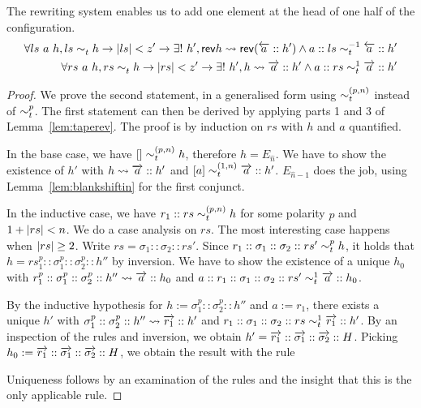 \documentclass[a4paper,UKenglish,cleveref, autoref]{lipics-v2019}
\newcommand{\strent}{\rightsquigarrow}
\begin{document}
\begin{lemma}\label{lem:tapeadd}
  The rewriting system enables us to add one element at the head of one half of the configuration.
  \begin{align*}
    \forall ls~a~h, ls \reprt{} h \rightarrow \length{ls} < z' \rightarrow \exists!~h', \rev{h} \strent{} \rev{(\polneg{a} :: h')} \land a :: ls \reprt{-1} \polneg{a} :: h' \\
    \forall rs~a~h, rs \reprt{} h \rightarrow \length{rs} < z' \rightarrow \exists!~h', h \strent{} \polpos{a} :: h' \land a :: rs \reprt{1} \polpos{a} :: h'
  \end{align*}
\end{lemma}
\begin{proof}
  We prove the second statement, in a generalised form using $\sim_t^{(p, n)}$ instead of $\sim_t^{p}$. 
  The first statement can then be derived by applying parts 1 and 3 of Lemma~\ref{lem:taperev}. 
  The proof is by induction on $rs$ with $h$ and $a$ quantified. 

  In the base case, we have $[] \sim_t^{(p, n)} h$, therefore $h = E_{\hat{n}}$. We have to show the existence of $h'$ with $h \strent{} \polpos{a} :: h'$ and $[a] \sim_t^{(1, n)} \overrightarrow{a} :: h'$. $E_{\hat{n}-1}$ does the job, using Lemma~\ref{lem:blankshiftin} for the first conjunct. 

  In the inductive case, we have $r_1 :: rs \sim_t^{(p, n)} h$ for some polarity $p$ and $1 +{|rs|} < n$. We do a case analysis on $rs$. The most interesting case happens when $|rs| \ge 2$. Write $rs = \sigma_1 :: \sigma_2 :: rs'$. 
  Since $r_1 :: \sigma_1 :: \sigma_2 ::rs' \sim_t^{p} h$, it holds that $h = rs_1^p :: \sigma_1^p :: \sigma_2^p :: h''$ by inversion. 
  We have to show the existence of a unique $h_0$ with $r_1^p :: \sigma_1^p :: \sigma_2^p :: h'' \strent{} \polpos{a} :: h_0$ and $a::r_1 :: \sigma_1 :: \sigma_2 :: rs' \sim_t^{1} \overrightarrow{a} :: h_0$. 

  By the inductive hypothesis for $h := \sigma_1^p :: \sigma_2^p :: h''$ and $a := r_1$, there exists a unique $h'$ with $\sigma_1^p :: \sigma_2^p :: h'' \strent{} \polpos{r_1} :: h'$ and $r_1 :: \sigma_1 :: \sigma_2 :: rs \sim_t^{1} \overrightarrow{r_1} :: h'$. 
  By an inspection of the rules and inversion, we obtain $h' = \overrightarrow{r_1} :: \overrightarrow{\sigma_1} :: \overrightarrow{\sigma_2} :: H$. 
  Picking $h_0 := \overrightarrow{r_1} :: \overrightarrow{\sigma_1} :: \overrightarrow{\sigma_2} :: H$, we obtain the result with the rule
  \begin{center}
  \end{center}
  Uniqueness follows by an examination of the rules and the insight that this is the only applicable rule. 
  \end{proof}
\end{document}
